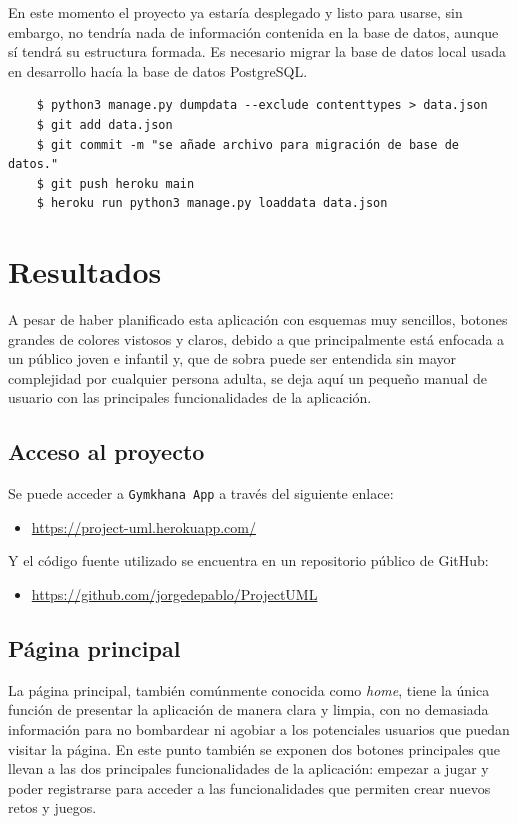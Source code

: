 \documentclass[a4paper, 12pt]{book}
\begin{document}
En este momento el proyecto ya estaría desplegado y listo para usarse, sin embargo, no tendría nada de información contenida en la base de datos, aunque sí tendrá su estructura formada. Es necesario migrar la base de datos local usada en desarrollo hacía la base de datos PostgreSQL.
\begin{verbatim}
	$ python3 manage.py dumpdata --exclude contenttypes > data.json
	$ git add data.json
	$ git commit -m "se añade archivo para migración de base de datos."
	$ git push heroku main
	$ heroku run python3 manage.py loaddata data.json
\end{verbatim}





\cleardoublepage
\chapter{Resultados}
\label{chap:resultados}

A pesar de haber planificado esta aplicación con esquemas muy sencillos, botones grandes de colores vistosos y claros, debido a que principalmente está enfocada a un público joven e infantil y, que de sobra puede ser entendida sin mayor complejidad por cualquier persona adulta, se deja aquí un pequeño manual de usuario con las principales funcionalidades de la aplicación.

\section{Acceso al proyecto}

Se puede acceder a \texttt{Gymkhana App} a través del siguiente enlace: 
\begin{itemize}
	\item \url{https://project-uml.herokuapp.com/}
\end{itemize}
Y el código fuente utilizado se encuentra en un repositorio público de GitHub: 
\begin{itemize}
	\item \url{https://github.com/jorgedepablo/ProjectUML}
\end{itemize}

\section{Página principal}
La página principal, también comúnmente conocida como \emph{home}, tiene la única función de presentar la aplicación de manera clara y limpia, con no demasiada información para no bombardear ni agobiar a los potenciales usuarios que puedan visitar la página. En este punto también se exponen dos botones principales que llevan a las dos principales funcionalidades de la aplicación: empezar a jugar y poder registrarse para acceder a las funcionalidades que permiten crear nuevos retos y juegos. 
\end{document}

